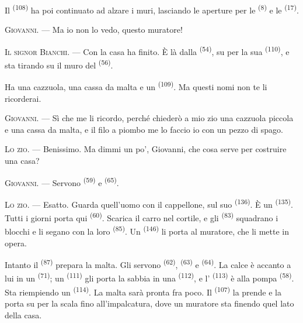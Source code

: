 Il  \textsuperscript{(108)} ha poi continuato ad alzare i muri,
lasciando le aperture per le  \textsuperscript{(8)} e le
 \textsuperscript{(17)}.

\textsc{Giovanni}. --- Ma io non lo vedo, questo muratore!

\textsc{Il signor Bianchi}. --- Con la casa ha finito. È là dalla 
\textsuperscript{(54)}, su per la sua  \textsuperscript{(110)}, e
sta tirando su il muro del  \textsuperscript{(56)}.

Ha una cazzuola, una cassa da malta e un 
\textsuperscript{(109)}. Ma questi nomi non te li ricorderai.

\textsc{Giovanni}. --- Sì che me li ricordo, perché chiederò a mio zio una cazzuola
piccola e una cassa da malta, e il filo a piombo me lo faccio io con un pezzo di
spago.

\VUsaut{3.0mm}
\VUsaut{3.0mm}

\textsc{Lo zio}. --- Benissimo. Ma dimmi un po', Giovanni, che cosa serve per
costruire una casa?

\textsc{Giovanni}. --- Servono  \textsuperscript{(59)} e
 \textsuperscript{(65)}.

\textsc{Lo zio}. --- Esatto. Guarda quell'uomo con il cappellone, sul suo
 \textsuperscript{(136)}. È un 
\textsuperscript{(135)}. Tutti i giorni porta qui 
\textsuperscript{(60)}. Scarica il carro nel cortile, e gli 
\textsuperscript{(83)} squadrano i blocchi e li segano con la loro
 \textsuperscript{(85)}. Un 
\textsuperscript{(146)} li porta al muratore, che li mette in opera.

Intanto il  \textsuperscript{(87)} prepara la malta. Gli servono
 \textsuperscript{(62)},  \textsuperscript{(63)} e
 \textsuperscript{(64)}. La calce è accanto a lui in un 
\textsuperscript{(71)}; un  \textsuperscript{(111)} gli porta
la sabbia in una  \textsuperscript{(112)}, e l'
\textsuperscript{(113)} è alla pompa \textsuperscript{(58)}. Sta riempiendo un
 \textsuperscript{(114)}. La malta sarà pronta fra poco. Il
 \textsuperscript{(107)} la prende e la porta su per la scala fino
all'impalcatura, dove un muratore sta finendo quel lato della casa.

